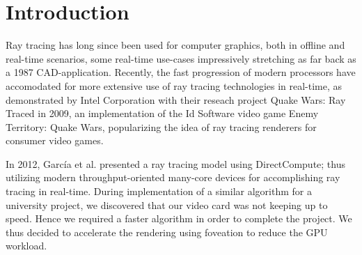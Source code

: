 \section{Introduction}
Ray tracing has long since been used for computer graphics, both in offline and real-time scenarios, some real-time use-cases impressively stretching as far back as a 1987 CAD-application\cite{stay87}.
Recently, the fast progression of modern processors have accomodated for more extensive use of ray tracing technologies in real-time, as demonstrated by Intel Corporation with their reseach project Quake Wars: Ray Traced in 2009\cite{pohl09}, an implementation of the Id Software video game Enemy Territory: Quake Wars, popularizing the idea of ray tracing renderers for consumer video games.

In 2012, Garc\'ia et al. presented a ray tracing model using DirectCompute\cite{garcia12}; thus utilizing modern throughput-oriented many-core devices for accomplishing ray tracing in real-time.
During implementation of a similar algorithm for a university project, we discovered that our video card was not keeping up to speed.
Hence we required a faster algorithm in order to complete the project.
We thus decided to accelerate the rendering using foveation to reduce the GPU workload.


